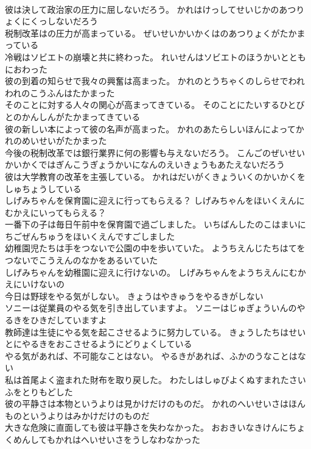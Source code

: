 \documentclass[8pt]{extreport}
\begin{document}
\begin{CJK}{UTF8}{min}
\\	彼は決して政治家の圧力に屈しないだろう。	かれはけっしてせいじかのあつりょくにくっしないだろう 
\\	税制改革はの圧力が高まっている。	ぜいせいかいかくはのあつりょくがたかまっている 
\\	冷戦はソビエトの崩壊と共に終わった。	れいせんはソビエトのほうかいとともにおわった 
\\	彼の到着の知らせで我々の興奮は高まった。	かれのとうちゃくのしらせでわれわれのこうふんはたかまった 
\\	そのことに対する人々の関心が高まってきている。	そのことにたいするひとびとのかんしんがたかまってきている 
\\	彼の新しい本によって彼の名声が高まった。	かれのあたらしいほんによってかれのめいせいがたかまった 
\\	今後の税制改革では銀行業界に何の影響も与えないだろう。	こんごのぜいせいかいかくではぎんこうぎょうかいになんのえいきょうもあたえないだろう 
\\	彼は大学教育の改革を主張している。	かれはだいがくきょういくのかいかくをしゅちょうしている 
\\	しげみちゃんを保育園に迎えに行ってもらえる？	しげみちゃんをほいくえんにむかえにいってもらえる？ 
\\	一番下の子は毎日午前中を保育園で過ごしました。	いちばんしたのこはまいにちごぜんちゅうをほいくえんですごしました 
\\	幼稚園児たちは手をつないで公園の中を歩いていた。	ようちえんじたちはてをつないでこうえんのなかをあるいていた 
\\	しげみちゃんを幼稚園に迎えに行けないの。	しげみちゃんをようちえんにむかえにいけないの 
\\	今日は野球をやる気がしない。	きょうはやきゅうをやるきがしない 
\\	ソニーは従業員のやる気を引き出していますよ。	ソニーはじゅぎょういんのやるきをひきだしていますよ 
\\	教師達は生徒にやる気を起こさせるように努力している。	きょうしたちはせいとにやるきをおこさせるようにどりょくしている 
\\	やる気があれば、不可能なことはない。	やるきがあれば、ふかのうなことはない 
\\	私は首尾よく盗まれた財布を取り戻した。	わたしはしゅびよくぬすまれたさいふをとりもどした 
\\	彼の平静さは本物というよりは見かけだけのものだ。	かれのへいせいさはほんものというよりはみかけだけのものだ 
\\	大きな危険に直面しても彼は平静さを失わなかった。	おおきいなきけんにちょくめんしてもかれはへいせいさをうしなわなかった 

\end{CJK}
\end{document}

